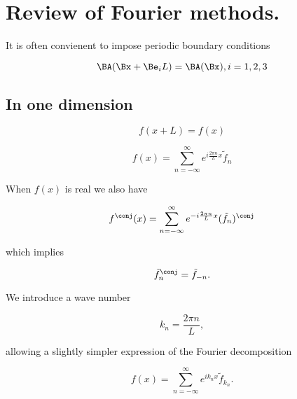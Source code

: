 \section{Review of Fourier methods.}

It is often convienent to impose periodic boundary conditions

\begin{equation}\label{eqn:relativisticElectrodynamicsL15:170}
\BA(\Bx + \Be_i L) = \BA(\Bx), i = 1,2,3
\end{equation}

\subsection{In one dimension}

\begin{equation}\label{eqn:relativisticElectrodynamicsL15:190}
f(x + L) = f(x)
\end{equation}

\begin{equation}\label{eqn:relativisticElectrodynamicsL15:210}
f(x) = \sum_{n=-\infty}^\infty e^{i \frac{2 \pi n}{L} x} \tilde{f}_n
\end{equation}

When $f(x)$ is real we also have

\begin{equation}\label{eqn:relativisticElectrodynamicsL15:230}
f^\conj(x) = \sum_{n = -\infty}^\infty e^{-i \frac{2 \pi n}{L} x} (\tilde{f}_n)^\conj
\end{equation}

which implies

\begin{equation}\label{eqn:relativisticElectrodynamicsL15:250}
{\tilde{f}^\conj}_{n} = \tilde{f}_{-n}.
\end{equation}

We introduce a wave number

\begin{equation}\label{eqn:relativisticElectrodynamicsL15:270}
k_n = \frac{2 \pi n}{L},
\end{equation}

allowing a slightly simpler expression of the Fourier decomposition

\begin{equation}\label{eqn:relativisticElectrodynamicsL15:290}
f(x) = \sum_{n=-\infty}^\infty e^{i k_n x} \tilde{f}_{k_n}.
\end{equation}

